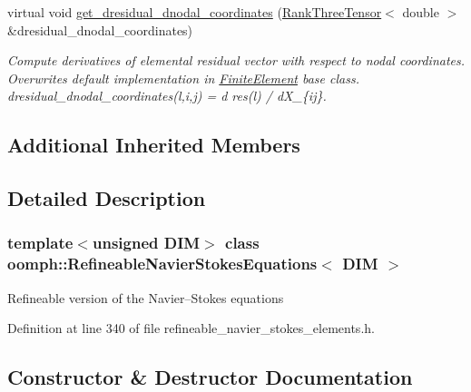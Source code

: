 \begin{DoxyCompactItemize}
virtual void \hyperlink{classoomph_1_1RefineableNavierStokesEquations_ac88134acd65f21845e5fc8e83b89c74a}{get\+\_\+dresidual\+\_\+dnodal\+\_\+coordinates} (\hyperlink{classoomph_1_1RankThreeTensor}{Rank\+Three\+Tensor}$<$ double $>$ \&dresidual\+\_\+dnodal\+\_\+coordinates)
\begin{DoxyCompactList}\small\item\em Compute derivatives of elemental residual vector with respect to nodal coordinates. Overwrites default implementation in \hyperlink{classoomph_1_1FiniteElement}{Finite\+Element} base class. dresidual\+\_\+dnodal\+\_\+coordinates(l,i,j) = d res(l) / d\+X\+\_\+\{ij\}. \end{DoxyCompactList}\end{DoxyCompactItemize}
\subsection*{Additional Inherited Members}


\subsection{Detailed Description}
\subsubsection*{template$<$unsigned D\+IM$>$\newline
class oomph\+::\+Refineable\+Navier\+Stokes\+Equations$<$ D\+I\+M $>$}

Refineable version of the Navier--Stokes equations 

Definition at line 340 of file refineable\+\_\+navier\+\_\+stokes\+\_\+elements.\+h.



\subsection{Constructor \& Destructor Documentation}
\mbox{\label{classoomph_1_1RefineableNavierStokesEquations_a533bcd11b492c5dbf308079722f7f95d}} 
